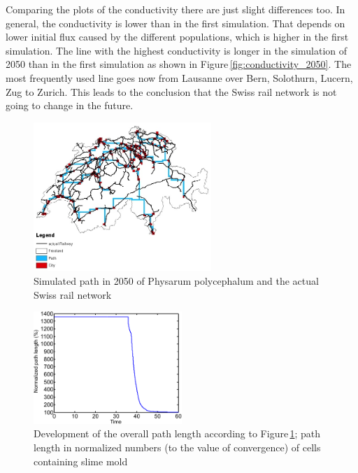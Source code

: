 \documentclass[11pt]{scrartcl}
\begin{document}
Comparing the plots of the conductivity there are just slight differences too. In general, the conductivity is lower than in the first simulation. That depends on lower initial flux caused by the different populations, which is higher in the first simulation. The line with the highest conductivity is longer in the simulation of 2050 than in the first simulation as shown in Figure\,\ref{fig:conductivity_2050}. The most frequently used line goes now from Lausanne over Bern, Solothurn, Lucern, Zug to Zurich. This leads to the conclusion that the Swiss rail network is not going to change in the future.

\begin{figure}[H]
	\centering
	\includegraphics[width=0.6\textwidth]{figures/path_railway_2050}
	\caption{Simulated path in 2050 of Physarum polycephalum and the actual Swiss rail network}
	\label{fig:path_2050}
\end{figure}

\begin{figure}[H]
	\centering
	\includegraphics[width=0.5\textwidth]{figures/plottrail2}
	\caption{Development of the overall path length according to Figure\,\ref{fig:path_2050}; path length in normalized numbers (to the value of convergence) of cells containing slime mold}
	\label{fig:plottrail_2050}
\end{figure}
\end{document}

